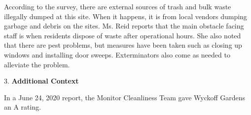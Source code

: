 According to the survey, there are external sources of trash and bulk waste illegally dumped at this site. When it happens, it is from local vendors dumping garbage and debris on the sites. Ms. Reid reports that the main obstacle facing staff is when residents dispose of waste after operational hours. She also noted that there are pest problems, but measures have been taken such as closing up windows and installing door sweeps. Exterminators also come as needed to alleviate the problem. 

3. \textbf{Additional Context} 

In a June 24, 2020 report, the Monitor Cleanliness Team gave Wyckoff Gardens an A rating. 